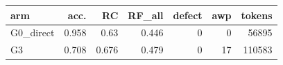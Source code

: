 \begin{tabular}{lrrrrrr}
\toprule
arm & acc. & RC & RF\_all & defect & awp & tokens \\
\midrule
G0\_direct & 0.958 & 0.63 & 0.446 & 0 & 0 & 56895 \\
G3 & 0.708 & 0.676 & 0.479 & 0 & 17 & 110583 \\
\bottomrule
\end{tabular}
